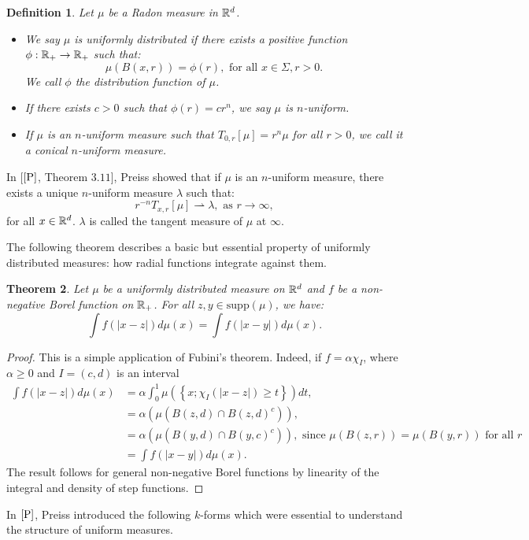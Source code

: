 \documentclass[11pt]{article}
\newtheorem{theorem}{Theorem}[section]
\newtheorem{definition}[theorem]{Definition}
\theoremstyle{definition}
\theoremstyle{remark}
\numberwithin{equation}{section}
\begin{document}
\begin{definition}
Let $\mu$ be a Radon measure in $\mathbb{R}^d$.
\begin{itemize}
\item We say $\mu$ is uniformly distributed if there exists a positive function $\phi : \mathbb{R}_{+} \rightarrow \mathbb{R}_{+}$ such that:
$$
\mu(B(x,r))=\phi(r), \text{ for all } x \in \Sigma, r>0.$$
We call $\phi$ the distribution function of $\mu$.

\item If there exists $c>0$ such that $\phi(r)=c r^n$, we say $\mu$ is $n$-uniform.

\item If $\mu$ is an $n$-uniform measure such that $T_{0,r}[\mu] = r^{n} \mu $ for all $r>0$, we call it a conical $n$-uniform measure.

\end{itemize}

\end{definition}

In [$\cite{P}$, Theorem $3.11$], Preiss showed that if $\mu$ is an $n$-uniform measure, there exists a unique $n$-uniform measure $\lambda$ such that:
\begin{equation}
r^{-n} T_{x,r} [\mu] \rightharpoonup \lambda, \mbox{ as } r \to \infty, 
\end{equation}
for all $x \in \mathbb{R}^{d}$. $\lambda$ is called the tangent measure of $\mu$ at $\infty$.


The following theorem describes a basic but essential property of uniformly distributed measures: how radial functions integrate against them.


\begin{theorem}\label{radial}
Let $\mu$ be a uniformly distributed measure on $\mathbb{R}^d$ and $f$ be a  non-negative Borel function on $\mathbb{R}_{+}$. For all $z , y \in \mbox{supp}(\mu)$, we have:
$$ \int f(|x-z|) d\mu(x) = \int f(|x-y|)d\mu(x).$$
\end{theorem}
\begin{proof}
This is a simple application of Fubini's theorem. Indeed, if $f= \alpha \chi_{I}$, where $\alpha\geq 0$ and $I=(c,d)$ is an interval
\begin{align*}
\int f(|x-z|) d\mu(x) &= \alpha \int_{0}^{1} \mu(\left\lbrace x; \chi_{I}(|x-z|) \geq t \right\rbrace) dt, 
                            \\&=\alpha \left( \mu(B(z,d) \cap {B(z,d)}^{c})\right) , 
                            \\&=\alpha \left( \mu(B(y,d)\cap {B(y,c)}^{c}) \right) , \mbox{ since } \mu(B(z,r)) = \mu(B(y,r)) \mbox{ for all }r
                            \\&=\int f(|x-y|) d\mu(x).
\end{align*}
The result follows for general non-negative Borel functions by linearity of the integral and density of step functions.
\end{proof}
In $\cite{P}$, Preiss introduced the following $k$-forms which were essential to understand the structure of uniform measures.
\end{document}

